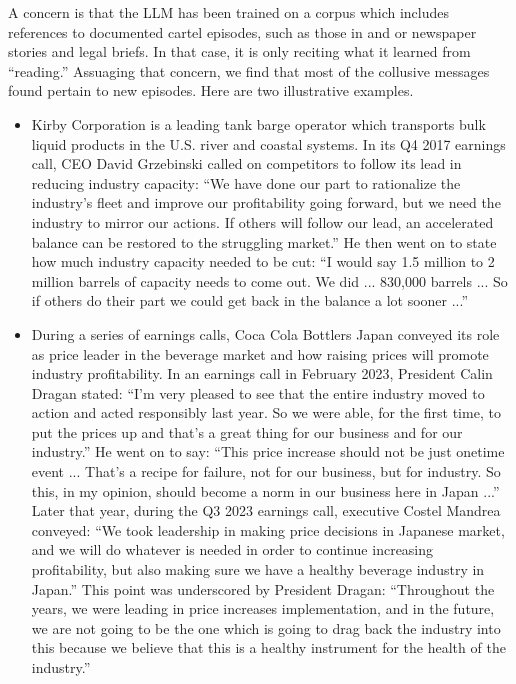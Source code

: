 A concern is that the LLM has been trained on a corpus which includes
references to documented cartel episodes, such as those in
\textcite{aryal2022coordinated} and \textcite{harrington2022collusion} or
newspaper stories and legal briefs. In that case, it is only reciting what
it learned from ``reading.'' Assuaging that concern, we find that most of
the collusive messages found pertain to new episodes. Here are two
illustrative examples.

\begin{itemize}
\item Kirby Corporation is a leading tank barge operator which transports
bulk liquid products in the U.S. river and coastal systems. In its Q4 2017
earnings call, CEO David Grzebinski called on competitors to follow its
lead in reducing industry capacity: ``We have done our part to rationalize
the industry's fleet and improve our profitability going forward, but we
need the industry to mirror our actions. If others will follow our lead, an
accelerated balance can be restored to the struggling market.'' He
then went on to state how much industry capacity needed to be cut: ``I
would say 1.5 million to 2 million barrels of capacity needs to come out. We
did ... 830,000 barrels ... So if others do their part we could get back in
the balance a lot sooner ...''

\item During a series of earnings calls, Coca Cola Bottlers Japan conveyed
its role as price leader in the beverage market and how raising prices will
promote industry profitability. In an earnings call in February 2023,
President Calin Dragan stated: ``I'm very pleased to see that the entire
industry moved to action and acted responsibly last year. So we were able,
for the first time, to put the prices up and that's a great thing for our
business and for our industry.'' He went on to say: ``This price increase
should not be just onetime event ... That's a recipe for failure, not for
our business, but for industry. So this, in my opinion, should become a
norm in our business here in Japan ...'' Later that year, during the Q3
2023 earnings call, executive Costel Mandrea conveyed: ``We took leadership
in making price decisions in Japanese market, and we will do whatever is
needed in order to continue increasing profitability, but also making sure
we have a healthy beverage industry in Japan.'' This point was underscored
by President Dragan: ``Throughout the years, we were leading in price
increases implementation, and in the future, we are not going to be the one
which is going to drag back the industry into this because we believe that
this is a healthy instrument for the health of the industry.''
\end{itemize}

